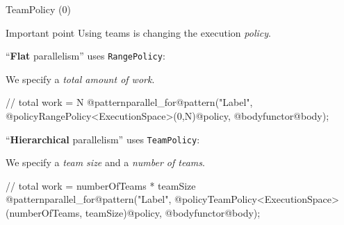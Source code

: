 \begin{frame}[fragile]{TeamPolicy (0)}

  \begin{block}{Important point}
    Using teams is changing the execution \emph{policy}.
  \end{block}

  \vspace{10pt}

  ``\textbf{Flat} parallelism'' uses \texttt{RangePolicy}:

  \vspace{3pt}

  \hspace{20pt}We specify a \emph{total amount of work}.

  \vspace{0pt}

  \begin{code}
// total work = N
@patternparallel_for@pattern("Label", 
  @policyRangePolicy<ExecutionSpace>(0,N)@policy, @bodyfunctor@body);
  \end{code}

  \pause
  \vspace{15pt}
  ``\textbf{Hierarchical} parallelism'' uses \texttt{TeamPolicy}:

  \vspace{3pt}

  \hspace{20pt}We specify a \emph{team size} and a \emph{number of teams}.

  \begin{code}[linebackgroundcolor={
      },
      keywords={}
    ]
// total work = numberOfTeams * teamSize
@patternparallel_for@pattern("Label", 
  @policyTeamPolicy<ExecutionSpace>(numberOfTeams, teamSize)@policy, @bodyfunctor@body);
  \end{code}

  \vspace{10pt}
\end{frame}


